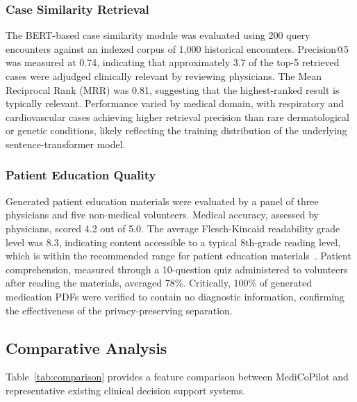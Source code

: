 \documentclass[conference]{IEEEtran}
\begin{document}
\subsubsection{Case Similarity Retrieval}
The BERT-based case similarity module was evaluated using 200 query encounters against an indexed corpus of 1,000 historical encounters. Precision@5 was measured at 0.74, indicating that approximately 3.7 of the top-5 retrieved cases were adjudged clinically relevant by reviewing physicians. The Mean Reciprocal Rank (MRR) was 0.81, suggesting that the highest-ranked result is typically relevant. Performance varied by medical domain, with respiratory and cardiovascular cases achieving higher retrieval precision than rare dermatological or genetic conditions, likely reflecting the training distribution of the underlying sentence-transformer model.

\subsubsection{Patient Education Quality}
Generated patient education materials were evaluated by a panel of three physicians and five non-medical volunteers. Medical accuracy, assessed by physicians, scored 4.2 out of 5.0. The average Flesch-Kincaid readability grade level was 8.3, indicating content accessible to a typical 8th-grade reading level, which is within the recommended range for patient education materials~\cite{b17}. Patient comprehension, measured through a 10-question quiz administered to volunteers after reading the materials, averaged 78\%. Critically, 100\% of generated medication PDFs were verified to contain no diagnostic information, confirming the effectiveness of the privacy-preserving separation.

\subsection{Comparative Analysis}

Table~\ref{tab:comparison} provides a feature comparison between MediCoPilot and representative existing clinical decision support systems.
\end{document}
